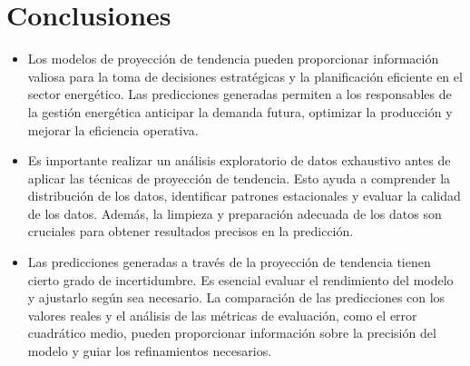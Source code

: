 \documentclass{article}
\begin{document}
\section{Conclusiones}
\begin{itemize}
  \item Los modelos de proyección de tendencia pueden proporcionar información valiosa para la toma de decisiones estratégicas y la planificación eficiente en el sector energético. Las predicciones generadas permiten a los responsables de la gestión energética anticipar la demanda futura, optimizar la producción y mejorar la eficiencia operativa.

 \item Es importante realizar un análisis exploratorio de datos exhaustivo antes de aplicar las técnicas de proyección de tendencia. Esto ayuda a comprender la distribución de los datos, identificar patrones estacionales y evaluar la calidad de los datos. Además, la limpieza y preparación adecuada de los datos son cruciales para obtener resultados precisos en la predicción.

 \item Las predicciones generadas a través de la proyección de tendencia tienen cierto grado de incertidumbre. Es esencial evaluar el rendimiento del modelo y ajustarlo según sea necesario. La comparación de las predicciones con los valores reales y el análisis de las métricas de evaluación, como el error cuadrático medio, pueden proporcionar información sobre la precisión del modelo y guiar los refinamientos necesarios.
\end{itemize}

\printbibliography
\end{document}
